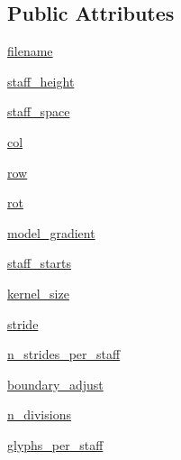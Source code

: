 \subsection*{Public Attributes}
\begin{DoxyCompactItemize}
\item 
\hyperlink{classautoscore_1_1musicdata_1_1MusicFile_afb514a66a95ae6d2b6064bffb4acfd40}{filename}
\item 
\hyperlink{classautoscore_1_1musicdata_1_1MusicFile_a9730a491a3fbb499b523abab1a78eff2}{staff\+\_\+height}
\item 
\hyperlink{classautoscore_1_1musicdata_1_1MusicFile_ae6bac1c7525ccf4708542f1af914361f}{staff\+\_\+space}
\item 
\hyperlink{classautoscore_1_1musicdata_1_1MusicFile_a15f8f0472645e6d49d93401496f2551d}{col}
\item 
\hyperlink{classautoscore_1_1musicdata_1_1MusicFile_a5a1d870c90397fcc18b659df3a24caba}{row}
\item 
\hyperlink{classautoscore_1_1musicdata_1_1MusicFile_aa6280fb328ef92537f3669b09eeaa454}{rot}
\item 
\hyperlink{classautoscore_1_1musicdata_1_1MusicFile_a1728265e16d8218aa9481a205d367572}{model\+\_\+gradient}
\item 
\hyperlink{classautoscore_1_1musicdata_1_1MusicFile_a493bbcf3119052c610c6cf7bc4862865}{staff\+\_\+starts}
\item 
\hyperlink{classautoscore_1_1musicdata_1_1MusicFile_a611564c1e2d4168ea877d4babfcbb50e}{kernel\+\_\+size}
\item 
\hyperlink{classautoscore_1_1musicdata_1_1MusicFile_af035776b1244fa7a1492a0d5ccf60834}{stride}
\item 
\hyperlink{classautoscore_1_1musicdata_1_1MusicFile_a95cfa2e1ee100a067205888ff6fb9eab}{n\+\_\+strides\+\_\+per\+\_\+staff}
\item 
\hyperlink{classautoscore_1_1musicdata_1_1MusicFile_a5d60d3e2e974d35e629d824e4ca2bd6d}{boundary\+\_\+adjust}
\item 
\hyperlink{classautoscore_1_1musicdata_1_1MusicFile_aa04311f9be4be7634c7692a12874fc67}{n\+\_\+divisions}
\item 
\hyperlink{classautoscore_1_1musicdata_1_1MusicFile_ae0817cd948b2dc3b3342ced098007ca1}{glyphs\+\_\+per\+\_\+staff}
\end{DoxyCompactItemize}

